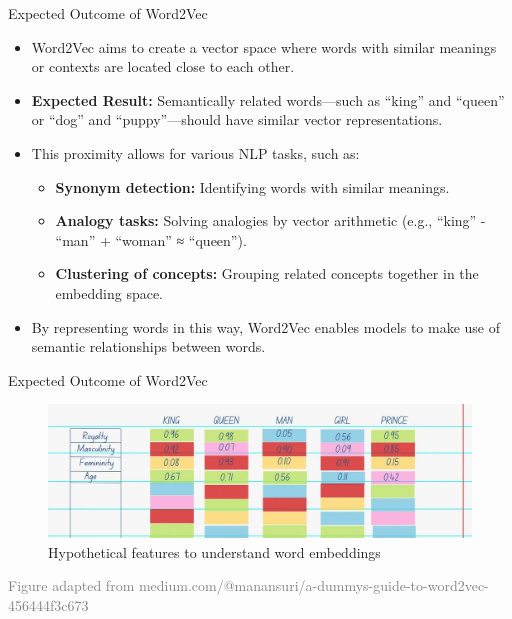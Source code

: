 \documentclass[serif, aspectratio=169]{beamer}
\begin{document}
\begin{frame}{Expected Outcome of Word2Vec}
	\begin{itemize}
		\item Word2Vec aims to create a vector space where words with similar meanings or contexts are located close to each other.
		\item \textbf{Expected Result:} Semantically related words—such as “king” and “queen” or “dog” and “puppy”—should have similar vector representations.
		\item This proximity allows for various NLP tasks, such as:
		\begin{itemize}
			\item \textbf{Synonym detection:} Identifying words with similar meanings.
			\item \textbf{Analogy tasks:} Solving analogies by vector arithmetic (e.g., “king” - “man” + “woman” ≈ “queen”).
			\item \textbf{Clustering of concepts:} Grouping related concepts together in the embedding space.
		\end{itemize}
		\item By representing words in this way, Word2Vec enables models to make use of semantic relationships between words.
	\end{itemize}
\end{frame}



\begin{frame}{Expected Outcome of Word2Vec}
	\begin{figure}
		\centering
		\includegraphics[width=1.0\textwidth]{pic/word2vec_expected.png}
		\caption*{Hypothetical features to understand word embeddings}
	\end{figure}
	\vspace{0.6cm}
	\hspace{-1.0cm}
	{\tiny \textcolor{gray}{Figure adapted from medium.com/@manansuri/a-dummys-guide-to-word2vec-456444f3c673}}
\end{frame}


%
\end{document}
